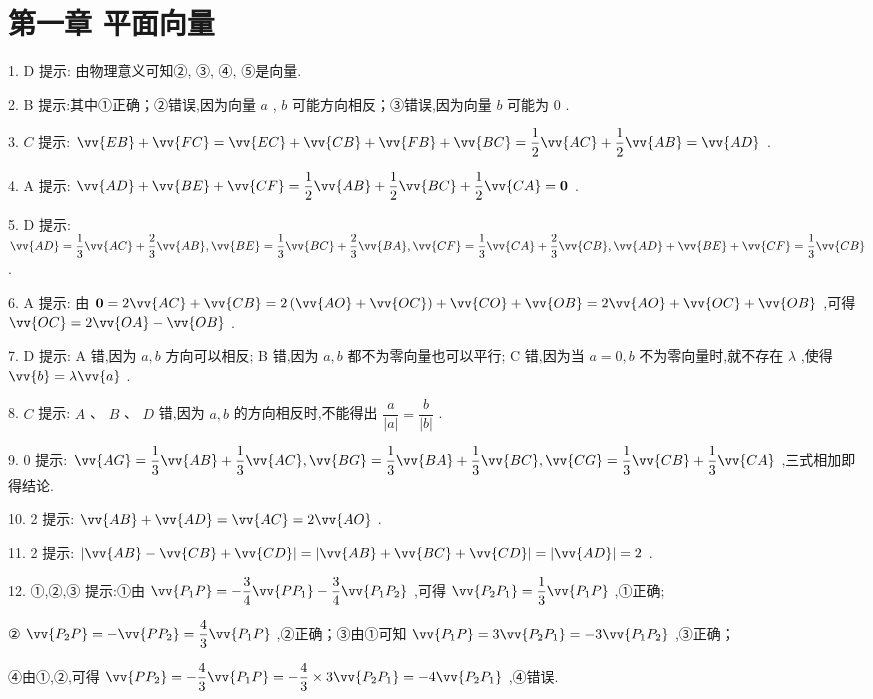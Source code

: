 \section*{第一章 平面向量}

1. D 提示: 由物理意义可知②, ③, ④, ⑤是向量.

2. B 提示:其中①正确；②错误,因为向量 $a$ , $b$ 可能方向相反；③错误,因为向量 $b$ 可能为 0 .

3. $C$ 提示: $\vv{EB} + \vv{FC} = \vv{EC} + \vv{CB} + \vv{FB} + \vv{BC} = \dfrac{1}{2}\vv{AC} + \dfrac{1}{2}\vv{AB} = \vv{AD}$ .

4. A 提示: $\vv{AD} + \vv{BE} + \vv{CF} = \dfrac{1}{2}\vv{AB} + \dfrac{1}{2}\vv{BC} + \dfrac{1}{2}\vv{CA} = \mathbf{0}$ .

5. D 提示: $\vv{AD} = \dfrac{1}{3}\vv{AC} + \dfrac{2}{3}\vv{AB},\vv{BE} = \dfrac{1}{3}\vv{BC} + \dfrac{2}{3}\vv{BA},\vv{CF} = \dfrac{1}{3}\vv{CA} + \dfrac{2}{3}\vv{CB},\vv{AD} + \vv{BE} + \vv{CF} = \dfrac{1}{3}\vv{CB}$ .

6. A 提示: 由 $\mathbf{0} = 2\vv{AC} + \vv{CB} = 2\left( {\vv{AO} + \vv{OC}}\right)  + \vv{CO} + \vv{OB} = 2\vv{AO} + \vv{OC} + \vv{OB}$ ,可得 $\vv{OC} = 2\vv{OA} - \vv{OB}$ .

7. D 提示: A 错,因为 $a,b$ 方向可以相反; B 错,因为 $a,b$ 都不为零向量也可以平行; C 错,因为当 $a = 0,b$ 不为零向量时,就不存在 $\lambda$ ,使得 $\vv{b} = \lambda \vv{a}$ .

8. $C$ 提示: $A$ 、 $B$ 、 $D$ 错,因为 $a,b$ 的方向相反时,不能得出 $\dfrac{a}{\left| a\right| } = \dfrac{b}{\left| b\right| }$ .

9. 0 提示: $\vv{AG} = \dfrac{1}{3}\vv{AB} + \dfrac{1}{3}\vv{AC},\vv{BG} = \dfrac{1}{3}\vv{BA} + \dfrac{1}{3}\vv{BC},\vv{CG} = \dfrac{1}{3}\vv{CB} + \dfrac{1}{3}\vv{CA}$ ,三式相加即得结论.

10. 2 提示: $\vv{AB} + \vv{AD} = \vv{AC} = 2\vv{AO}$ .

11. 2 提示: $\left| {\vv{AB} - \vv{CB} + \vv{CD}}\right|  = \left| {\vv{AB} + \vv{BC} + \vv{CD}}\right|  = \left| \vv{AD}\right|  = 2$ .

12. ①,②,③ 提示:①由 $\vv{{P}_{1}P} =  - \dfrac{3}{4}\vv{P{P}_{1}} - \dfrac{3}{4}\vv{{P}_{1}{P}_{2}}$ ,可得 $\vv{{P}_{2}{P}_{1}} = \dfrac{1}{3}\vv{{P}_{1}P}$ ,①正确;

② $\vv{{P}_{2}P} =  - \vv{P{P}_{2}} = \dfrac{4}{3}\vv{{P}_{1}P}$ ,②正确；③由①可知 $\vv{{P}_{1}P} = 3\vv{{P}_{2}{P}_{1}} =  - 3\vv{{P}_{1}{P}_{2}}$ ,③正确；

④由①,②,可得 $\vv{P{P}_{2}} =  - \dfrac{4}{3}\vv{{P}_{1}P} =  - \dfrac{4}{3} \times  3\vv{{P}_{2}{P}_{1}} =  - 4\vv{{P}_{2}{P}_{1}}$ ,④错误.

